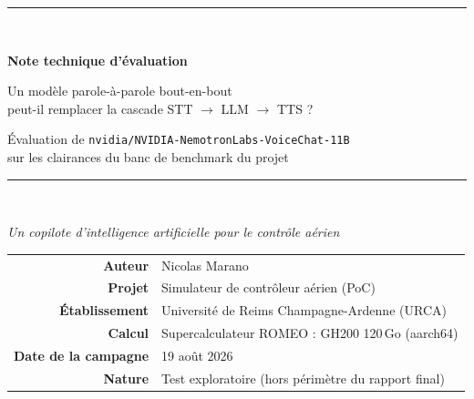 \documentclass[11pt,a4paper]{article}
\begin{document}
\begin{titlepage}
\centering
\vspace*{1.2cm}
{\color{atcblue}\rule{\textwidth}{2pt}}\\[0.5cm]
{\Huge\bfseries\color{atcblue} Note technique d'évaluation\par}
\vspace{0.35cm}
{\LARGE\color{atcteal} Un modèle parole-à-parole bout-en-bout\\ peut-il remplacer la cascade STT $\rightarrow$ LLM $\rightarrow$ TTS ?\par}
\vspace{0.25cm}
{\large Évaluation de \texttt{nvidia/NVIDIA-NemotronLabs-VoiceChat-11B}\\[2pt]
sur les clairances du banc de benchmark du projet\par}
\vspace{0.4cm}
{\color{atcblue}\rule{\textwidth}{2pt}}\\[1.0cm]

{\large\itshape Un copilote d'intelligence artificielle pour le contrôle aérien\par}
\vspace{1.4cm}

{\normalsize
\begin{tabular}{rl}
\large\bfseries Auteur & \large Nicolas Marano\\[4pt]
\large\bfseries Projet & \large Simulateur de contrôleur aérien (PoC)\\[4pt]
\large\bfseries Établissement & \large Université de Reims Champagne-Ardenne (URCA)\\[4pt]
\large\bfseries Calcul & \large Supercalculateur ROMEO : GH200 120\,Go (aarch64)\\[4pt]
\large\bfseries Date de la campagne & \large 19 août 2026\\[4pt]
\large\bfseries Nature & \large Test exploratoire (hors périmètre du rapport final)\\
\end{tabular}}


\end{titlepage}
\end{document}
